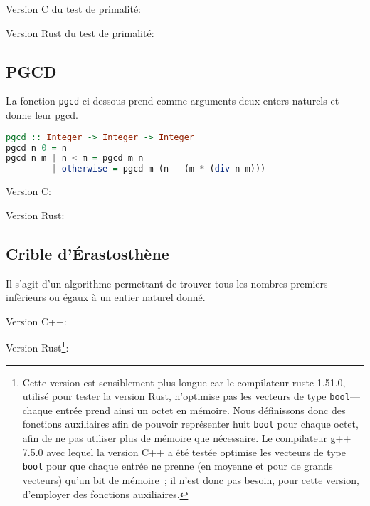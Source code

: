 \medskip

\noindent Version C du test de primalité: 


\medskip

\noindent Version Rust du test de primalité: 


\subsection{PGCD}
\label{app:Haskell_pgcd}

\noindent 
La fonction \texttt{pgcd} ci-dessous prend comme arguments deux enters naturels et donne leur pgcd.
\begin{lstlisting}[language=Haskell]
pgcd :: Integer -> Integer -> Integer
pgcd n 0 = n
pgcd n m | n < m = pgcd m n
         | otherwise = pgcd m (n - (m * (div n m)))
\end{lstlisting}

\medskip

\noindent Version C: 


\medskip

\noindent Version Rust: 


\subsection{Crible d'Érastosthène}
\label{app:code_erastosthene}

Il s'agit d'un algorithme permettant de trouver tous les nombres premiers infèrieurs ou égaux à un entier naturel donné.

\bigskip

\noindent Version C++: 


\bigskip

\noindent Version Rust\footnote{
    Cette version est sensiblement plus longue car le compilateur rustc 1.51.0, utilisé pour tester la version Rust, n'optimise pas les vecteurs de type \texttt{bool}—chaque entrée prend ainsi un octet en mémoire. 
    Nous définissons donc des fonctions auxiliaires afin de pouvoir représenter huit \texttt{bool} pour chaque octet, afin de ne pas utiliser plus de mémoire que nécessaire.
    Le compilateur g++ 7.5.0 avec lequel la version C++ a été testée optimise les vecteurs de type \texttt{bool} pour que chaque entrée ne prenne (en moyenne et pour de grands vecteurs) qu'un bit de mémoire ; il n'est donc pas besoin, pour cette version, d'employer des fonctions auxiliaires. 
}: 

